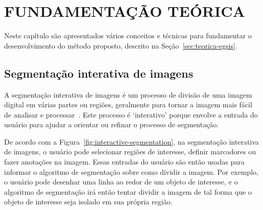 \chapter{FUNDAMENTAÇÃO TEÓRICA}\label{cap:fundamentacao-teorica}


Neste capítulo são apresentados vários conceitos e técnicas para fundamentar
o desenvolvimento do método proposto, descrito na Seção~\ref{sec:teorica-egsis}.


\section{Segmentação interativa de imagens}\label{sec:segmentacao-interativa}

A segmentação interativa de imagens é um processo de divisão de uma
imagem digital em várias partes ou regiões, geralmente para tornar a
imagem mais fácil de analisar e processar~\cite{ramadan2020survey}. Este processo é `interativo'
porque envolve a entrada do usuário para ajudar a orientar ou refinar
o processo de segmentação.

\begin{figure}[h!]
  \captionsetup{width=12cm}
  \centering
  {}
\end{figure}
\FloatBarrier{}

De acordo com a Figura~\ref{fig:interactive-segmentation}, na
segmentação interativa de imagens, o usuário pode selecionar regiões
de interesse, definir marcadores ou fazer anotações na imagem. Essas
entradas do usuário são então usadas para informar o algoritmo de
segmentação sobre como dividir a imagem. Por exemplo, o usuário pode
desenhar uma linha ao redor de um objeto de interesse, e o algoritmo
de segmentação irá então tentar dividir a imagem de tal forma que o
objeto de interesse seja isolado em sua própria região.

